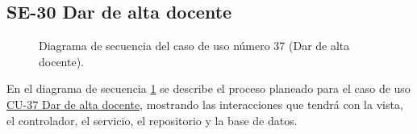 \subsection{SE-30 Dar de alta docente}

\begin{figure}[htbp!]
	\begin{center}
		\caption{Diagrama de secuencia del caso de uso número 37 (Dar de alta docente).}
		\label{fig:Diagrama de secuencia CU-37}
	\end{center}
\end{figure}

En el diagrama de secuencia \ref{fig:Diagrama de secuencia CU-37} se describe el proceso planeado para el caso de uso \hyperlink{CU-37}{CU-37 Dar de alta docente}, mostrando las interacciones que tendrá con la vista, el controlador, el servicio, el repositorio y la base de datos.

\newpage